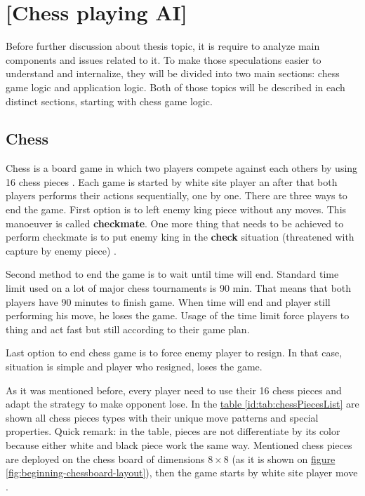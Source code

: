 
\chapter{[Chess playing AI]}
Before further discussion about thesis topic, it is require to analyze main components and issues related to it. To make those speculations easier to understand and internalize, they will be divided into two main sections: chess game logic and application logic. Both of those topics will be described in each distinct sections, starting with chess game logic.
    \section{Chess}
    Chess is a board game in which two players compete against each others by using 16 chess pieces \cite{bib:book-chess-bible}. Each game is started by white site player an after that both players performs their actions sequentially, one by one. There are three ways to end the game. First option is to left enemy king piece without any moves. This manoeuver is called \textbf{checkmate}. One more thing that needs to be achieved to perform checkmate is to put enemy king in the \textbf{check} situation (threatened with capture by enemy piece) \cite{bib:book-chess-bible,bib:internet-learn-how-to-play-chess}. 

    Second method to end the game is to wait until time will end. Standard time limit used on a lot of major chess tournaments is 90 min. That means that both players have 90 minutes to finish game. When time will end and player still performing his move, he loses the game. Usage of the time limit force players to thing and act fast but still according to their game plan.

    Last option to end chess game is to force enemy player to resign. In that case, situation is simple and player who resigned, loses the game. 
    
    As it was mentioned before, every player need to use their 16 chess pieces and adapt the strategy to make opponent lose. In the \hyperref[id:tab:chessPiecesList]{table \ref*{id:tab:chessPiecesList}} are shown all chess pieces types with their unique move patterns and special properties. Quick remark: in the table, pieces are not differentiate by its color because either white and black piece work the same way. Mentioned chess pieces are deployed on the chess board of dimensions $8 \times 8$ (as it is shown on \hyperref[fig:beginning-chessboard-layout]{figure \ref*{fig:beginning-chessboard-layout}}), then the game starts by white site player move \cite{bib:book-chess-bible,bib:book-bobby-fisher-teaches-chess,bib:book-mastering-chess-logic}.

